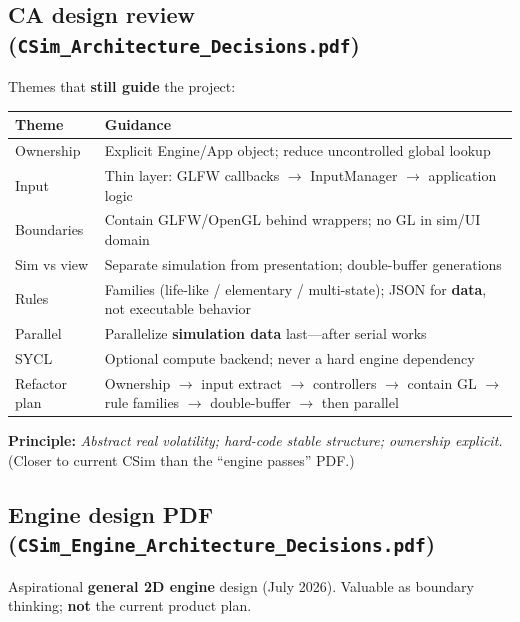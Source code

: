 \documentclass[10pt,a4paper]{article}
\begin{document}
\subsection{CA design review (\texttt{CSim\_Architecture\_Decisions.pdf})}
Themes that \textbf{still guide} the project:
\begin{table}[h!]
\centering
\small
\begin{tabularx}{\textwidth}{l X}
\toprule
\textbf{Theme} & \textbf{Guidance} \\
\midrule
Ownership & Explicit Engine/App object; reduce uncontrolled global lookup \\
Input & Thin layer: GLFW callbacks $\rightarrow$ InputManager $\rightarrow$ application logic \\
Boundaries & Contain GLFW/OpenGL behind wrappers; no GL in sim/UI domain \\
Sim vs view & Separate simulation from presentation; double-buffer generations \\
Rules & Families (life-like / elementary / multi-state); JSON for \textbf{data}, not executable behavior \\
Parallel & Parallelize \textbf{simulation data} last---after serial works \\
SYCL & Optional compute backend; never a hard engine dependency \\
Refactor plan & Ownership $\rightarrow$ input extract $\rightarrow$ controllers $\rightarrow$ contain GL $\rightarrow$ rule families $\rightarrow$ double-buffer $\rightarrow$ then parallel \\
\bottomrule
\end{tabularx}
\end{table}

\noindent \textbf{Principle:} \textit{Abstract real volatility; hard-code stable structure; ownership explicit.} \quad (Closer to current CSim than the ``engine passes'' PDF.)

\subsection{Engine design PDF (\texttt{CSim\_Engine\_Architecture\_Decisions.pdf})}
Aspirational \textbf{general 2D engine} design (July 2026). Valuable as boundary thinking; \textbf{not} the current product plan.
\end{document}
